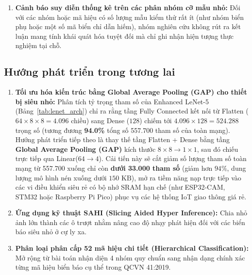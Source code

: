 \documentclass[a4paper, 11pt]{article}
\begin{document}
\begin{enumerate}
    \item \textbf{Cảnh báo suy diễn thống kê trên các phân nhóm cỡ mẫu nhỏ:} Đối với các nhóm hoặc mã hiệu có số lượng mẫu kiểm thử rất ít (như nhóm biển phụ hoặc một số mã biển chỉ dẫn hiếm), nhóm nghiên cứu không rút ra kết luận mang tính khái quát hóa tuyệt đối mà chỉ ghi nhận hiện tượng thực nghiệm tại chỗ.
\end{enumerate}

\subsection{Hướng phát triển trong tương lai}
\label{subsec:huong_phat_trien}

\begin{enumerate}
    \item \textbf{Tối ưu hóa kiến trúc bằng Global Average Pooling (GAP) cho thiết bị siêu nhỏ:}
    Phân tích tỷ trọng tham số của Enhanced LeNet-5 (Bảng~\ref{tab:lenet_arch}) chỉ ra rằng tầng Fully Connected kết nối từ Flatten ($64 \times 8 \times 8 = 4.096$ chiều) sang Dense ($128$) chiếm tới $4.096 \times 128 = 524.288$ trọng số (tương đương \textbf{94.0\%} tổng số 557.700 tham số của toàn mạng). Hướng phát triển tiếp theo là thay thế tầng Flatten + Dense bằng tầng \textbf{Global Average Pooling (GAP)} kích thước $8 \times 8 \rightarrow 1 \times 1$, sau đó chiếu trực tiếp qua Linear($64 \rightarrow 4$). Cải tiến này sẽ cắt giảm số lượng tham số toàn mạng từ 557.700 xuống chỉ còn \textbf{dưới 33.000 tham số} (giảm hơn $94\%$, dung lượng mô hình nén xuống dưới $150\text{ KB}$), mở ra tiềm năng nạp trực tiếp vào các vi điều khiển siêu rẻ có bộ nhớ SRAM hạn chế (như ESP32-CAM, STM32 hoặc Raspberry Pi Pico) phục vụ các hệ thống IoT giao thông giá rẻ.
    \item \textbf{Ứng dụng kỹ thuật SAHI (Slicing Aided Hyper Inference):} Chia nhỏ ảnh lớn thành các ô trượt nhằm nâng cao độ nhạy phát hiện đối với các biển báo siêu nhỏ ở cự ly xa.
    \item \textbf{Phân loại phân cấp 52 mã hiệu chi tiết (Hierarchical Classification):} Mở rộng từ bài toán nhận diện 4 nhóm quy chuẩn sang nhận dạng chính xác từng mã hiệu biển báo cụ thể trong QCVN 41:2019.
\end{enumerate}
\end{document}
